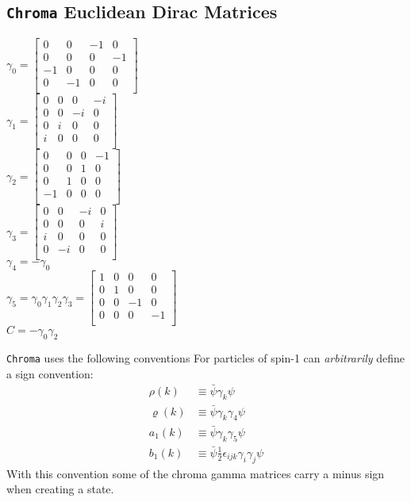 \subsection{\texttt{Chroma} Euclidean Dirac Matrices}
$\gamma_0 = 
\begin{bmatrix}
    0 & 0 & -1 & 0 \\
    0 & 0 & 0 & -1 \\
    -1 & 0 & 0 & 0 \\
    0 & -1 & 0 & 0 \\
    \end{bmatrix}$
\\
$\gamma_1 = 
\begin{bmatrix}
    0 & 0 & 0 & -i \\
    0 & 0 & -i & 0 \\
    0 & i & 0 & 0 \\
    i & 0 & 0 & 0 \\
    \end{bmatrix}$
\\
$\gamma_2 = 
\begin{bmatrix}
    0 & 0 & 0 & -1 \\
    0 & 0 & 1 & 0 \\
    0 & 1 & 0 & 0 \\
    -1 & 0 & 0 & 0 \\
    \end{bmatrix}$
\\
$\gamma_3 = 
\begin{bmatrix}
    0 & 0 & -i & 0 \\
    0 & 0 & 0 & i \\
    i & 0 & 0 & 0 \\
    0 & -i & 0 & 0 \\
    \end{bmatrix}$
\\
$\gamma_4 = -\gamma_0$ \\
$\gamma_5 = \gamma_0\gamma_1\gamma_2\gamma_3 = 
\begin{bmatrix}
    1 & 0 & 0 & 0 \\
    0 & 1 & 0 & 0 \\
    0 & 0 & -1 & 0 \\
    0 & 0 & 0 & -1 \\
    \end{bmatrix}$
\\
$C = -\gamma_0\gamma_2$

\texttt{Chroma} uses the following conventions \cite{Edwards_2005} For particles of spin-1 can {\em arbitrarily } define a sign convention:
\begin{align}
  \rho(k) &\equiv \bar{\psi} \gamma_k \psi \nonumber \\
  \varrho(k) &\equiv \bar{\psi} \gamma_k \gamma_4 \psi \nonumber\\
  a_1(k) &\equiv \bar{\psi} \gamma_k \gamma_5 \psi \nonumber\\
  b_1(k) &\equiv \bar{\psi}\tfrac{1}{2}  \epsilon_{ijk} \gamma_i \gamma_j \psi \nonumber
\end{align}
With this convention some of the chroma gamma matrices carry a minus sign when creating a state.\\

